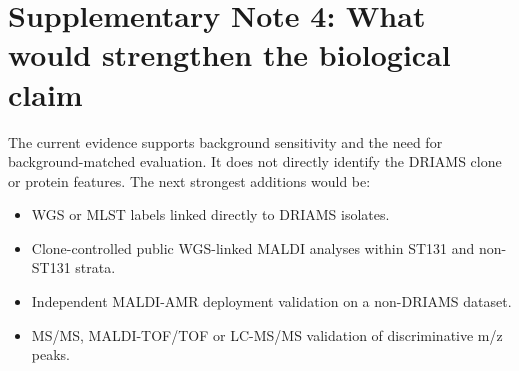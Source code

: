 \documentclass[11pt]{article}
\begin{document}


\section*{Supplementary Note 4: What would strengthen the biological claim}

The current evidence supports background sensitivity and the need for background-matched evaluation. It does not directly identify the DRIAMS clone or protein features. The next strongest additions would be:

\begin{itemize}
  \item WGS or MLST labels linked directly to DRIAMS isolates.
  \item Clone-controlled public WGS-linked MALDI analyses within ST131 and non-ST131 strata.
  \item Independent MALDI-AMR deployment validation on a non-DRIAMS dataset.
  \item MS/MS, MALDI-TOF/TOF or LC-MS/MS validation of discriminative m/z peaks.
\end{itemize}
\end{document}
